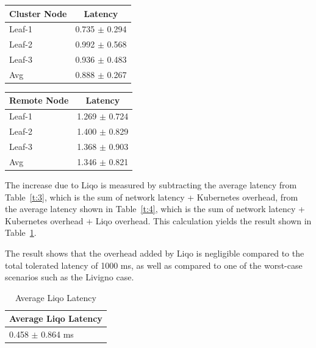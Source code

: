 \begin{minipage}{0.45\textwidth}
  \centering
  \vspace{0.5cm}
  \begin{tabular}{|l|c|}
  \hline
  \textbf{Cluster Node} & \textbf{Latency}  \\ 
  \hline
  Leaf-1 & 0.735 $\pm$ 0.294  \\
  \hline
  Leaf-2 & 0.992 $\pm$ 0.568 \\
  \hline
  Leaf-3 & 0.936 $\pm$ 0.483 \\
  \hline
  Avg & 0.888 $\pm$ 0.267 \\
  \hline
  \end{tabular}
  \label{t:3}\vspace{0.5cm}
\end{minipage}%
\hspace{0.05\textwidth} %
\begin{minipage}{0.45\textwidth}
  \centering
  \vspace{0.5cm}
  \begin{tabular}{|l|c|}
  \hline
  \textbf{Remote Node} & \textbf{Latency}  \\ 
  \hline
  Leaf-1 & 1.269 $\pm$ 0.724  \\
  \hline
  Leaf-2 & 1.400 $\pm$ 0.829 \\
  \hline
  Leaf-3 & 1.368 $\pm$ 0.903 \\
  \hline
  Avg & 1.346 $\pm$ 0.821 \\
  \hline
  \end{tabular}
  \label{t:4}\vspace{0.5cm}
\end{minipage}

The increase due to Liqo is measured by subtracting the average latency from Table~\ref{t:3}, which is the sum of network latency + Kubernetes overhead, from the average latency shown in Table~\ref{t:4}, which is the sum of network latency + Kubernetes overhead + Liqo overhead. This calculation yields the result shown in Table~\ref{t:5}. 

The result shows that the overhead added by Liqo is negligible compared to the total tolerated latency of 1000 ms, as well as compared to one of the worst-case scenarios such as the Livigno case.

\begin{table}[ht]              
\centering 
\begin{tabular}{|l|}
\hline
\textbf{Average Liqo Latency} \\ 
\hline
0.458  $\pm$ 0.864 ms \\
\hline
\end{tabular}
\caption{Average Liqo Latency} \label{t:5}  
\end{table}

